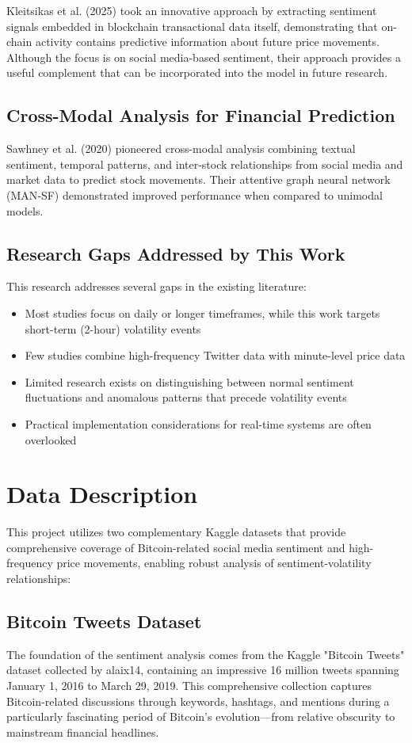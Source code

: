 \documentclass[11pt,twocolumn]{article}
\begin{document}
Kleitsikas et al. (2025) took an innovative approach by extracting sentiment signals embedded in blockchain transactional data itself, demonstrating that on-chain activity contains predictive information about future price movements. Although the focus is on social media-based sentiment, their approach provides a useful complement that can be incorporated into the model in future research.

\subsection{\textbf{Cross-Modal Analysis for Financial Prediction}}
Sawhney et al. (2020) pioneered cross-modal analysis combining textual sentiment, temporal patterns, and inter-stock relationships from social media and market data to predict stock movements. Their attentive graph neural network (MAN‑SF) demonstrated improved performance when compared to unimodal models.

\subsection{\textbf{Research Gaps Addressed by This Work}}
This research addresses several gaps in the existing literature:
\begin{itemize}
\item Most studies focus on daily or longer timeframes, while this work targets short-term (2-hour) volatility events
\item Few studies combine high-frequency Twitter data with minute-level price data
\item Limited research exists on distinguishing between normal sentiment fluctuations and anomalous patterns that precede volatility events
\item Practical implementation considerations for real-time systems are often overlooked
\end{itemize}

\section{Data Description}
This project utilizes two complementary Kaggle datasets that provide comprehensive coverage of Bitcoin-related social media sentiment and high-frequency price movements, enabling robust analysis of sentiment-volatility relationships:

\subsection{\textbf{Bitcoin Tweets Dataset}}
The foundation of the sentiment analysis comes from the Kaggle "Bitcoin Tweets" dataset collected by alaix14, containing an impressive 16 million tweets spanning January 1, 2016 to March 29, 2019. This comprehensive collection captures Bitcoin-related discussions through keywords, hashtags, and mentions during a particularly fascinating period of Bitcoin's evolution—from relative obscurity to mainstream financial headlines.
\end{document}
